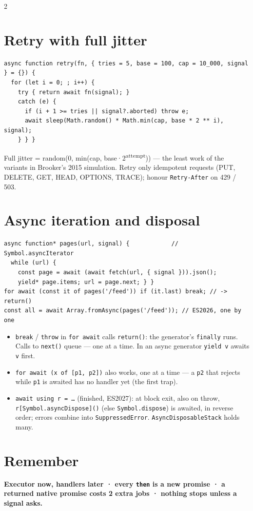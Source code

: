 \documentclass[8pt]{extarticle}
\newcommand\ct[1]{\texttt{#1}}
\begin{document}
\begin{multicols}{2}
\section{Retry with full jitter}
\begin{lstlisting}[style=js]
async function retry(fn, { tries = 5, base = 100, cap = 10_000, signal } = {}) {
  for (let i = 0; ; i++) {
    try { return await fn(signal); }
    catch (e) {
      if (i + 1 >= tries || signal?.aborted) throw e;
      await sleep(Math.random() * Math.min(cap, base * 2 ** i), signal);
    } } }
\end{lstlisting}
Full jitter = random(0, min(cap, base·2\textsuperscript{attempt})) — the least work of the
variants in Brooker's 2015 simulation. Retry only idempotent requests (PUT, DELETE, GET, HEAD, OPTIONS,
TRACE); honour \ct{Retry-After} on 429 / 503.

\section{Async iteration and disposal}
\begin{lstlisting}[style=js]
async function* pages(url, signal) {            // Symbol.asyncIterator
  while (url) {
    const page = await (await fetch(url, { signal })).json();
    yield* page.items; url = page.next; } }
for await (const it of pages('/feed')) if (it.last) break; // -> return()
const all = await Array.fromAsync(pages('/feed')); // ES2026, one by one
\end{lstlisting}
\begin{itemize}
  \item \ct{break} / \ct{throw} in \ct{for await} calls \ct{return()}: the generator's
        \ct{finally} runs. Calls to \ct{next()} queue — one at a time. In an async generator
        \ct{yield v} awaits \ct{v} first.
  \item \ct{for await (x of [p1, p2])} also works, one at a time — a \ct{p2} that rejects while
        \ct{p1} is awaited has no handler yet (the first trap).
  \item \ct{await using r = …} (finished, ES2027): at block exit, also on throw,
        \ct{r[Symbol.asyncDispose]()} (else \ct{Symbol.dispose}) is awaited, in reverse order;
        errors combine into \ct{SuppressedError}. \ct{AsyncDisposableStack} holds many.
\end{itemize}

\section{Remember}
\textbf{Executor now, handlers later · every \ct{then} is a new promise · a returned native
promise costs 2 extra jobs · nothing stops unless a signal asks.}

\end{multicols}

\end{document}
